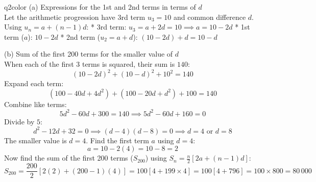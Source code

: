 \documentclass[11pt,a4paper]{article}
\begin{document}
\begin{ansbox}{q2color}
(a) Expressions for the 1st and 2nd terms in terms of $d$\\[4pt]
Let the arithmetic progression have 3rd term $u_3 = 10$ and common difference $d$. Using $u_n = a + (n-1)d$:
* 3rd term: $u_3 = a + 2d = 10 \implies a = 10 - 2d$
* 1st term ($a$): $\boxed{10 - 2d}$
* 2nd term ($u_2 = a + d$): $(10 - 2d) + d = \boxed{10 - d}$

(b) Sum of the first 200 terms for the smaller value of $d$\\[4pt]
When each of the first 3 terms is squared, their sum is $140$:
\[
(10-2d)^2 + (10-d)^2 + 10^2 = 140
\]
Expand each term:
\[
(100 - 40d + 4d^2) + (100 - 20d + d^2) + 100 = 140
\]
Combine like terms:
\[
5d^2 - 60d + 300 = 140 \implies 5d^2 - 60d + 160 = 0
\]
Divide by $5$:
\[
d^2 - 12d + 32 = 0 \implies (d - 4)(d - 8) = 0 \implies d = 4 \text{ or } d = 8
\]
The smaller value is $d = 4$. Find the first term $a$ using $d = 4$:
\[
a = 10 - 2(4) = 10 - 8 = 2
\]
Now find the sum of the first 200 terms ($S_{200}$) using $S_n = \frac{n}{2}[2a + (n-1)d]$:
\[
S_{200} = \frac{200}{2} [2(2) + (200 - 1)(4)] = 100 [4 + 199 \times 4] = 100 [4 + 796] = 100 \times 800 = \boxed{80\,000}
\]
\end{ansbox}
\end{document}
